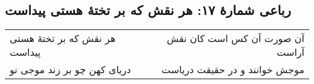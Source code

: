\begin{center}
\section*{رباعی شمارهٔ ۱۷: هر نقش که بر تختۀ هستی پیداست}
\label{sec:017}
\begin{longtable}{l p{0.5cm} r}
هر نقش که بر تختهٔ هستی پیداست
&&
آن صورت آن کس است کان نقش آراست
\\
دریای کهن چو بر زند موجی نو
&&
موجش خوانند و در حقیقت دریاست
\\
\end{longtable}
\end{center}
